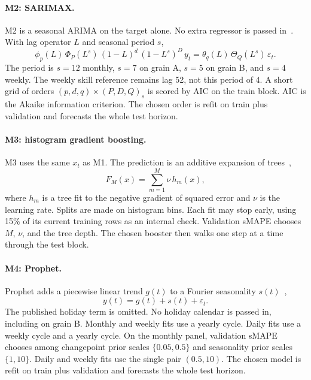 \paragraph{M2: SARIMAX.}
M2 is a seasonal ARIMA on the target alone.
No extra regressor is passed in~\citep{box1970tsa,hyndman2021fpp3}.
With lag operator $L$ and seasonal period $s$,
\begin{equation}
  \phi_p(L)\,\Phi_P(L^{s})\,(1-L)^{d}\,(1-L^{s})^{D}\, y_t
  = \theta_q(L)\,\Theta_Q(L^{s})\,\varepsilon_t.
  \label{eq:sarimax}
\end{equation}
The period is $s = 12$ monthly, $s = 7$ on grain A, $s = 5$ on grain B, and $s = 4$ weekly.
The weekly skill reference remains lag 52, not this period of 4.
A short grid of orders $(p,d,q)\times(P,D,Q)_s$ is scored by AIC on the train block.
AIC is the Akaike information criterion.
The chosen order is refit on train plus validation and forecasts the whole test horizon.

\paragraph{M3: histogram gradient boosting.}
M3 uses the same $x_t$ as M1.
The prediction is an additive expansion of trees~\citep{friedman2001greedy},
\begin{equation}
  F_M(x) = \sum_{m=1}^{M} \nu\, h_m(x),
  \label{eq:gbm}
\end{equation}
where $h_m$ is a tree fit to the negative gradient of squared error and $\nu$ is the learning rate.
Splits are made on histogram bins.
Each fit may stop early, using 15\% of its current training rows as an internal check.
Validation sMAPE chooses $M$, $\nu$, and the tree depth.
The chosen booster then walks one step at a time through the test block.

\paragraph{M4: Prophet.}
Prophet adds a piecewise linear trend $g(t)$ to a Fourier seasonality $s(t)$~\citep{taylor2018prophet},
\begin{equation}
  y(t) = g(t) + s(t) + \varepsilon_t.
  \label{eq:prophet}
\end{equation}
The published holiday term is omitted.
No holiday calendar is passed in, including on grain B.
Monthly and weekly fits use a yearly cycle.
Daily fits use a weekly cycle and a yearly cycle.
On the monthly panel, validation sMAPE chooses among changepoint prior scales $\{0.05, 0.5\}$ and seasonality prior scales $\{1, 10\}$.
Daily and weekly fits use the single pair $(0.5, 10)$.
The chosen model is refit on train plus validation and forecasts the whole test horizon.

